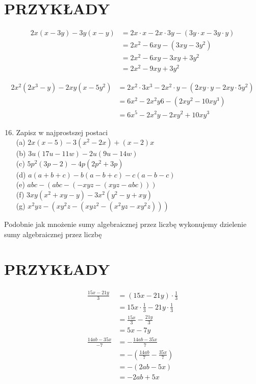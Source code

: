 \documentclass[10pt]{article}
\begin{document}
\section*{PRZYKŁADY}
\[
\begin{aligned}
2 x(x-3 y)-3 y(x-y) & =2 x \cdot x-2 x \cdot 3 y-(3 y \cdot x-3 y \cdot y) \\
& =2 x^{2}-6 x y-\left(3 x y-3 y^{2}\right) \\
& =2 x^{2}-6 x y-3 x y+3 y^{2} \\
& =2 x^{2}-9 x y+3 y^{2}
\end{aligned}
\]

\[
\begin{aligned}
2 x^{2}\left(2 x^{3}-y\right)-2 x y\left(x-5 y^{2}\right) & =2 x^{2} \cdot 3 x^{3}-2 x^{2} \cdot y-\left(2 x y \cdot y-2 x y \cdot 5 y^{2}\right) \\
& =6 x^{2}-2 x^{2} y 6-\left(2 x y^{2}-10 x y^{3}\right) \\
& =6 x^{5}-2 x^{2} y-2 x y^{2}+10 x y^{3}
\end{aligned}
\]

\begin{enumerate}
  \setcounter{enumi}{15}
  \item Zapisz w najprostszej postaci\\
(a) \(2 x(x-5)-3\left(x^{2}-2 x\right)+(x-2) x\)\\
(b) \(3 u(17 u-11 w)-2 u(9 u-14 w)\)\\
(c) \(5 p^{2}(3 p-2)-4 p\left(2 p^{2}+3 p\right)\)\\
(d) \(a(a+b+c)-b(a-b+c)-c(a-b-c)\)\\
(e) \(a b c-(a b c-(-x y z-(x y z-a b c)))\)\\
(f) \(3 x y\left(x^{2}+x y-y\right)-3 x^{2}\left(y^{2}-y+x y\right)\)\\
(g) \(x^{2} y z-\left(x y^{2} z-\left(x y z^{2}-\left(x^{2} y z-x y^{2} z\right)\right)\right)\)
\end{enumerate}

Podobnie jak mnożenie sumy algebraicznej przez liczbę wykonujemy dzielenie sumy algebraicznej przez liczbę

\section*{PRZYKŁADY}
\[
\begin{aligned}
\frac{15 x-21 y}{3} & =(15 x-21 y) \cdot \frac{1}{3} \\
& =15 x \cdot \frac{1}{3}-21 y \cdot \frac{1}{3} \\
& =\frac{15 x}{3}-\frac{21 y}{3} \\
& =5 x-7 y \\
\frac{14 a b-35 x}{-7} & =-\frac{14 a b-35 x}{7} \\
& =-\left(\frac{14 a b}{7}-\frac{35 x}{7}\right) \\
& =-(2 a b-5 x) \\
& =-2 a b+5 x
\end{aligned}
\]
\end{document}

